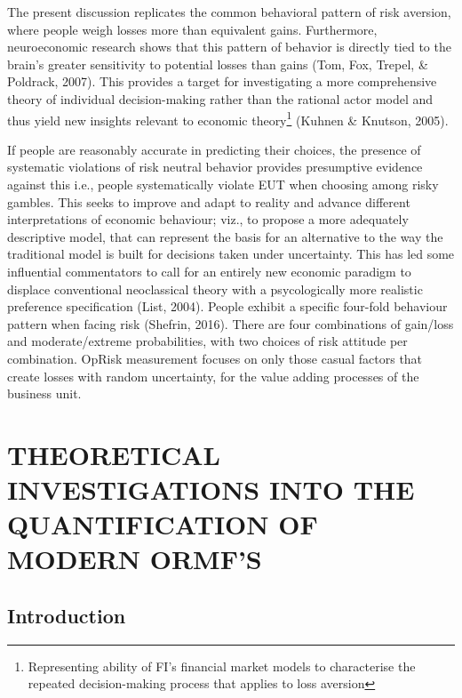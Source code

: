 \documentclass{DissertateUSU}
\begin{document}
The present discussion replicates the common behavioral pattern of risk
aversion, where people weigh losses more than equivalent gains.
Furthermore, neuroeconomic research shows that this pattern of behavior
is directly tied to the brain's greater sensitivity to potential losses
than gains (Tom, Fox, Trepel, \& Poldrack, 2007). This provides a target
for investigating a more comprehensive theory of individual
decision-making rather than the rational actor model and thus yield new
insights relevant to economic
theory\footnote{Representing ability of FI's financial market models to characterise the repeated decision-making process that applies to loss aversion}
(Kuhnen \& Knutson, 2005).\medskip  

If people are reasonably accurate in predicting their choices, the
presence of systematic violations of risk neutral behavior provides
presumptive evidence against this i.e., people systematically violate
EUT when choosing among risky gambles. This seeks to improve and adapt
to reality and advance different interpretations of economic behaviour;
viz., to propose a more adequately descriptive model, that can represent
the basis for an alternative to the way the traditional model is built
for decisions taken under uncertainty. This has led some influential
commentators to call for an entirely new economic paradigm to displace
conventional neoclassical theory with a psycologically more realistic
preference specification (List, 2004). People exhibit a specific
four-fold behaviour pattern when facing risk (Shefrin, 2016). There are
four combinations of gain/loss and moderate/extreme probabilities, with
two choices of risk attitude per combination. OpRisk measurement focuses
on only those casual factors that create losses with random uncertainty,
for the value adding processes of the business unit.

\singlespacing

\FloatBarrier
\newpage
{}
\fancyhead[R]{\thepage}
\fancyfoot[C]{}

\chapter{THEORETICAL INVESTIGATIONS INTO THE QUANTIFICATION OF MODERN ORMF'S}

\doublespacing

\section{Introduction}
\label{sec:IntroductionChapter5}
\end{document}
